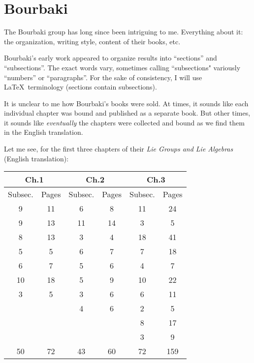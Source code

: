 \chapter{Bourbaki}

\begin{node}\label{bourbaki-0000}%
The Bourbaki group has long since been intriguing to me. Everything about it: the organization, writing style, content of their books, etc.
\end{node}

\begin{node}\label{bourbaki-0001}%
Bourbaki's early work appeared to organize results into ``sections'' and
``subsections''. The exact words vary, sometimes calling ``subsections"
variously ``numbers'' or ``paragraphs''. For the sake of consistency, I
will use \LaTeX\ terminology (sections contain subsections).

It is unclear to me how Bourbaki's books were sold. At times, it sounds
like each individual chapter was bound and published as a separate
book. But other times, it sounds like \emph{eventually} the chapters
were collected and bound as we find them in the English translation.

\begin{node}[Subsections]\label{bourbaki-0006}%
Let me see, for the first three chapters of their \textit{Lie Groups and Lie Algebras} (English translation):


% 
\begin{center}
\begin{tabular}{|c|c|c|c|c|c|}
\hline\multicolumn{2}{|c|}{Ch.1}
& \multicolumn{2}{c|}{Ch.2} & \multicolumn{2}{c|}{Ch.3} \\\hline
Subsec. & Pages & Subsec. & Pages & Subsec. & Pages\\
      9 &   11  &      6  &    8  &     11  &    24\\
      9 &   13  &     11  &   14  &      3  &     5\\
      8 &   13  &      3  &    4  &     18  &    41\\
      5 &    5  &      6  &    7  &      7  &    18\\
      6 &    7  &      5  &    6  &      4  &     7\\
     10 &   18  &      5  &    9  &     10  &    22\\
      3 &    5  &      3  &    6  &      6  &    11\\
        &       &      4  &    6  &      2  &     5\\
        &       &         &       &      8  &    17\\
        &       &         &       &      3  &     9\\
      \hline
     50 &   72  &     43  &   60  &     72  &   159\\
      \hline
\end{tabular}
\end{center}


\end{node}
\end{node}
